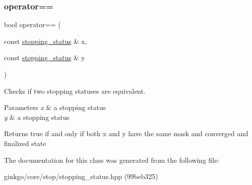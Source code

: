 \subsubsection{\texorpdfstring{operator==}{operator==}}
{\footnotesize\ttfamily bool operator== (\begin{DoxyParamCaption}\item[{const \hyperlink{classgko_1_1stopping__status}{stopping\+\_\+status} \&}]{x,  }\item[{const \hyperlink{classgko_1_1stopping__status}{stopping\+\_\+status} \&}]{y }\end{DoxyParamCaption})\hspace{0.3cm}{\ttfamily [friend]}}



Checks if two stopping statuses are equivalent. 


\begin{DoxyParams}{Parameters}
{\em x} & a stopping status \\
\hline
{\em y} & a stopping status\\
\hline
\end{DoxyParams}
\begin{DoxyReturn}{Returns}
true if and only if both {\ttfamily x} and {\ttfamily y} have the same mask and converged and finalized state 
\end{DoxyReturn}


The documentation for this class was generated from the following file\+:\begin{DoxyCompactItemize}
\item 
ginkgo/core/stop/stopping\+\_\+status.\+hpp (99beb325)\end{DoxyCompactItemize}
